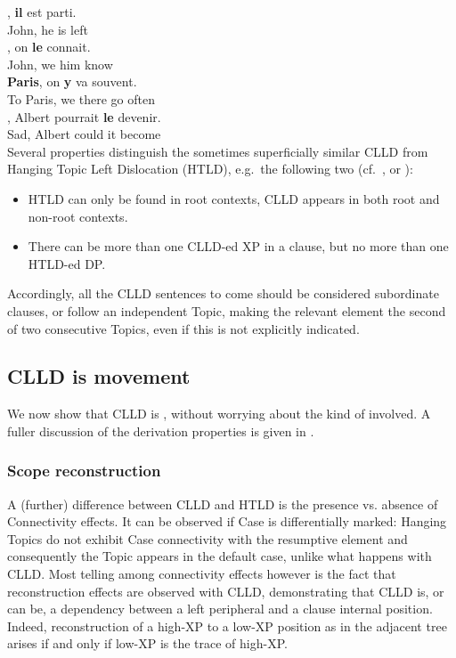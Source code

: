 \documentclass[output=paper]{langsci/langscibook}
\begin{document}
\ea
\ea
	, {\bf il} est parti.\\
John, he is left\\
\ex
	, on  {\bf le} connait.\\
John, we him know\\
\ex
	 {\bf Paris}, on  {\bf y} va souvent.\\
To Paris, we there go often\\
\ex
	, Albert pourrait {\bf le} devenir.\label{predle}\\
Sad, Albert could it become \\
\z
\z
%
Several properties distinguish the sometimes superficially similar
\gls{CLLD} from Hanging Topic Left Dislocation
(HTLD), e.g.\ the following two (cf.\ \citealp{AlexiadouLD}, or
\citealp{Krapova2008}):

\begin{itemize}
\item HTLD can only be found in root contexts, \gls{CLLD} appears in both root and non-root contexts.
\item There can be more than one \gls{CLLD}-ed XP in a clause, but no more than one HTLD-ed DP.
\end{itemize}
Accordingly, all the \gls{CLLD} sentences to come
should be considered subordinate clauses, or follow an independent Topic,
making the relevant element the second of two consecutive Topics, even if this
is not explicitly indicated.

\subsection{CLLD is movement}

We now show that \gls{CLLD} is , without
worrying about the kind of  involved. A fuller discussion of the
derivation properties is given in \cite{Angelopoulo2017}.

\subsubsection{Scope reconstruction}

A (further) difference between \gls{CLLD} and HTLD
is the presence vs. absence of Connectivity effects. It can be observed if Case
is differentially marked: Hanging Topics do not exhibit Case connectivity with
the resumptive element and consequently the Topic appears in the default case,
unlike what happens with CLLD. Most telling among connectivity effects however
is the fact that reconstruction effects are observed with CLLD,  demonstrating
that \gls{CLLD} is, or can be, a 
dependency between a left peripheral  and a clause internal position.
Indeed, reconstruction of a high-XP  to a low-XP position as in the adjacent
tree arises if and only if  low-XP is the trace of  high-XP.
\end{document}

